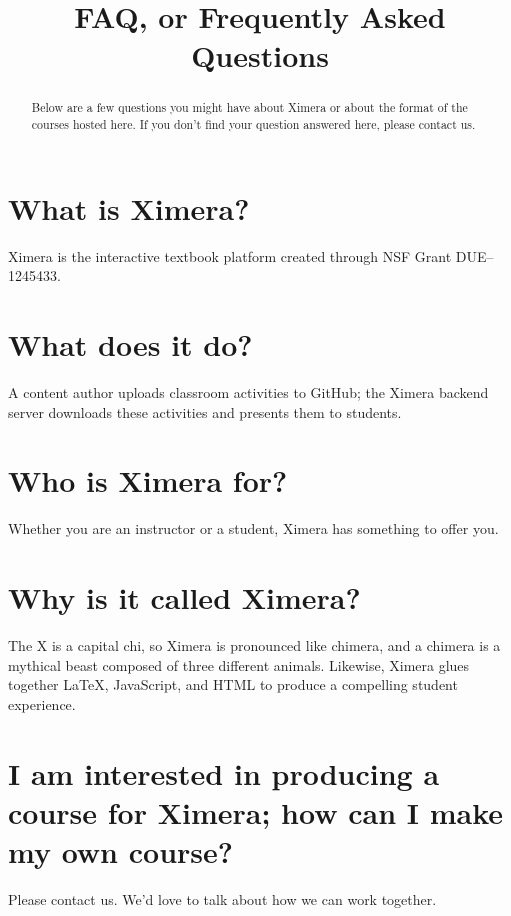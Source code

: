 \documentclass{ximera}
\title{FAQ, or  Frequently Asked Questions}
\begin{document}
\begin{abstract}
Below are a few questions you might have about Ximera or about the
format of the courses hosted here.  If you don't find your question
answered here, please contact us.
\end{abstract}

\maketitle

\section{What is Ximera?}

Ximera is the interactive textbook platform created through NSF Grant
DUE--1245433.


\section{What does it do?}

A content author uploads classroom activities to GitHub; the Ximera
backend server downloads these activities and presents them to
students.

\section{Who is Ximera for?}

Whether you are an instructor or a student, Ximera has something to offer you.

\section{Why is it called Ximera?}

The X is a capital chi, so Ximera is pronounced like chimera, and a
chimera is a mythical beast composed of three different animals.
Likewise, Ximera glues together LaTeX, JavaScript, and HTML to produce
a compelling student experience.

\section{I am interested in producing a course for Ximera; how can I make my own course?}

Please contact us.  We'd love to talk about how we can work together.
\end{document}
